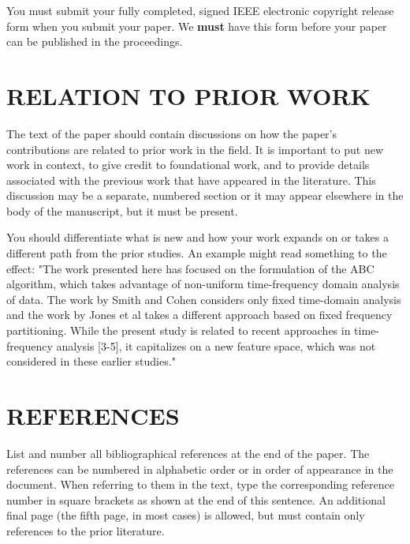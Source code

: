 \documentclass{article}
\begin{document}
You must submit your fully completed, signed IEEE electronic copyright release
form when you submit your paper. We {\bf must} have this form before your paper
can be published in the proceedings.

\section{RELATION TO PRIOR WORK}
\label{sec:prior}

The text of the paper should contain discussions on how the paper's
contributions are related to prior work in the field. It is important
to put new work in  context, to give credit to foundational work, and
to provide details associated with the previous work that have appeared
in the literature. This discussion may be a separate, numbered section
or it may appear elsewhere in the body of the manuscript, but it must
be present.

You should differentiate what is new and how your work expands on
or takes a different path from the prior studies. An example might
read something to the effect: "The work presented here has focused
on the formulation of the ABC algorithm, which takes advantage of
non-uniform time-frequency domain analysis of data. The work by
Smith and Cohen considers only fixed time-domain analysis and
the work by Jones et al takes a different approach based on
fixed frequency partitioning. While the present study is related
to recent approaches in time-frequency analysis [3-5], it capitalizes
on a new feature space, which was not considered in these earlier
studies."

\vfill\pagebreak

\section{REFERENCES}
\label{sec:refs}

List and number all bibliographical references at the end of the
paper. The references can be numbered in alphabetic order or in
order of appearance in the document. When referring to them in
the text, type the corresponding reference number in square
brackets as shown at the end of this sentence. An
additional final page (the fifth page, in most cases) is
allowed, but must contain only references to the prior
literature.
\end{document}
